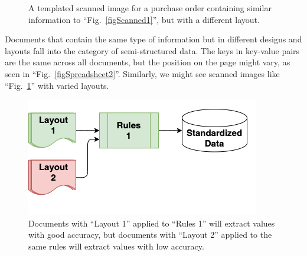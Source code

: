 \documentclass[conference]{IEEEtran}
\begin{document}
\begin{figure}[ht]
    \centerline{
}
\caption{A templated scanned image for a purchase order containing similar information to ``Fig.~\ref{figScanned1}'', but with a different layout.}
\label{figScanned2}
\end{figure}

Documents that contain the same type of information but in different designs and layouts fall into the category of semi-structured data. The keys in key-value pairs are the same across all documents, but the position on the page might vary, as seen in ``Fig.~\ref{figSpreadsheet2}''. Similarly, we might see scanned images like ``Fig.~\ref{figScanned2}'' with varied layouts.

\begin{figure}[ht]
\centerline{\includegraphics[width=\columnwidth]{RulesFlow2a.png}}
\caption{Documents with ``Layout 1'' applied to ``Rules 1'' will extract values with good accuracy, but documents with ``Layout 2'' applied to the same rules will extract values with low accuracy.}
\label{figRulesFlow2a}
\end{figure}
\end{document}
